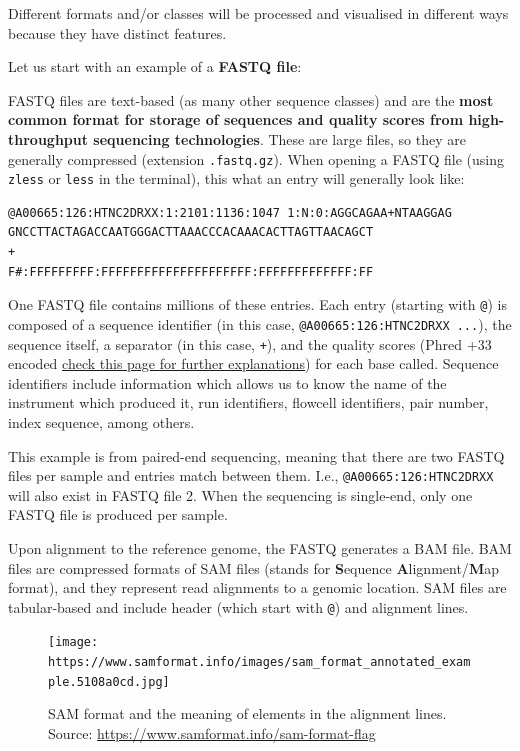 \documentclass[
]{book}
\begin{document}
Different formats and/or classes will be processed and visualised in different ways because they have distinct features.

Let us start with an example of a \textbf{FASTQ file}:

FASTQ files are text-based (as many other sequence classes) and are the \textbf{most common format for storage of sequences and quality scores from high-throughput sequencing technologies}. These are large files, so they are generally compressed (extension \texttt{.fastq.gz}). When opening a FASTQ file (using \texttt{zless} or \texttt{less} in the terminal), this what an entry will generally look like:

\begin{verbatim}
@A00665:126:HTNC2DRXX:1:2101:1136:1047 1:N:0:AGGCAGAA+NTAAGGAG
GNCCTTACTAGACCAATGGGACTTAAACCCACAAACACTTAGTTAACAGCT
+
F#:FFFFFFFFF:FFFFFFFFFFFFFFFFFFFFF:FFFFFFFFFFFFF:FF
\end{verbatim}

One FASTQ file contains millions of these entries. Each entry (starting with \texttt{@}) is composed of a sequence identifier (in this case, \texttt{@A00665:126:HTNC2DRXX\ ...}), the sequence itself, a separator (in this case, \texttt{+}), and the quality scores (Phred +33 encoded \href{https://people.duke.edu/~ccc14/duke-hts-2018/bioinformatics/quality_scores.html}{check this page for further explanations}) for each base called. Sequence identifiers include information which allows us to know the name of the instrument which produced it, run identifiers, flowcell identifiers, pair number, index sequence, among others.

This example is from paired-end sequencing, meaning that there are two FASTQ files per sample and entries match between them. I.e., \texttt{@A00665:126:HTNC2DRXX} will also exist in FASTQ file 2. When the sequencing is single-end, only one FASTQ file is produced per sample.

Upon alignment to the reference genome, the FASTQ generates a BAM file. BAM files are compressed formats of SAM files (stands for \textbf{S}equence \textbf{A}lignment/\textbf{M}ap format), and they represent read alignments to a genomic location. SAM files are tabular-based and include header (which start with \texttt{@}) and alignment lines.

\begin{figure}
\centering
\texttt{[image: https://www.samformat.info/images/sam\_format\_annotated\_example.5108a0cd.jpg]}
\caption{SAM format and the meaning of elements in the alignment lines. Source: \url{https://www.samformat.info/sam-format-flag}}
\end{figure}
\end{document}
